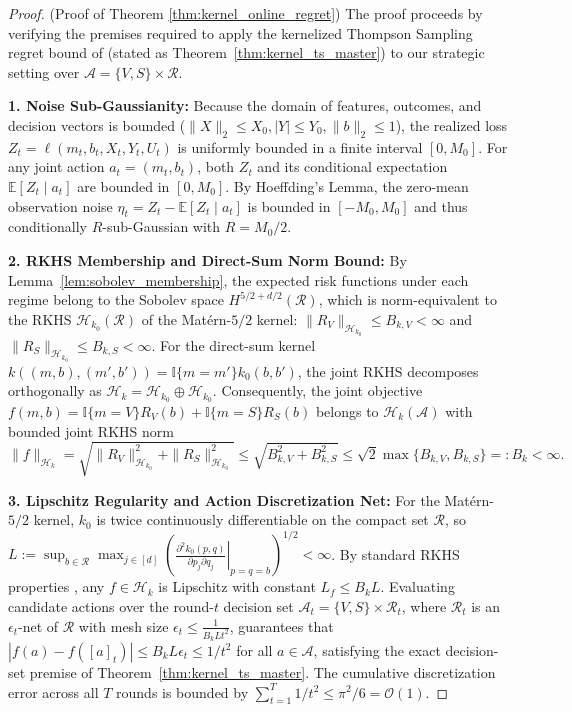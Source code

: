 \begin{proof}(Proof of Theorem \ref{thm:kernel_online_regret})\label{proof:kernel_online_regret}\label{app:proof_kernel_online_regret}
The proof proceeds by verifying the premises required to apply the kernelized Thompson Sampling regret bound of \citet[Theorem 4]{chowdhury2017kernelized} (stated as Theorem~\ref{thm:kernel_ts_master}) to our strategic setting over $\mathcal{A} = \{V, S\} \times \mathcal{R}$.

\noindent\textbf{1. Noise Sub-Gaussianity:} 
Because the domain of features, outcomes, and decision vectors is bounded ($\|X\|_2 \le X_0, |Y| \le Y_0, \|b\|_2 \le 1$), the realized loss $Z_t = \ell(m_t, b_t, X_t, Y_t, U_t)$ is uniformly bounded in a finite interval $[0, M_0]$. For any joint action $a_t = (m_t, b_t)$, both $Z_t$ and its conditional expectation $\mathbb{E}[Z_t \mid a_t]$ are bounded in $[0, M_0]$. By Hoeffding's Lemma, the zero-mean observation noise $\eta_t = Z_t - \mathbb{E}[Z_t \mid a_t]$ is bounded in $[-M_0, M_0]$ and thus conditionally $R$-sub-Gaussian with $R = M_0/2$.

\noindent\textbf{2. RKHS Membership and Direct-Sum Norm Bound:} 
By Lemma~\ref{lem:sobolev_membership}, the expected risk functions under each regime belong to the Sobolev space $H^{5/2+d/2}(\mathcal{R})$, which is norm-equivalent to the RKHS $\mathcal{H}_{k_0}(\mathcal{R})$ of the Matérn-$5/2$ kernel: $\|R_V\|_{\mathcal{H}_{k_0}} \le B_{k,V} < \infty$ and $\|R_S\|_{\mathcal{H}_{k_0}} \le B_{k,S} < \infty$. For the direct-sum kernel $k((m, b), (m', b')) = \mathbb{I}\{m = m'\} k_0(b, b')$, the joint RKHS decomposes orthogonally as $\mathcal{H}_k = \mathcal{H}_{k_0} \oplus \mathcal{H}_{k_0}$. Consequently, the joint objective $f(m, b) = \mathbb{I}\{m=V\} R_V(b) + \mathbb{I}\{m=S\} R_S(b)$ belongs to $\mathcal{H}_k(\mathcal{A})$ with bounded joint RKHS norm
\begin{equation*}
    \|f\|_{\mathcal{H}_k} = \sqrt{\|R_V\|_{\mathcal{H}_{k_0}}^2 + \|R_S\|_{\mathcal{H}_{k_0}}^2} \le \sqrt{B_{k,V}^2 + B_{k,S}^2} \le \sqrt{2}\max\{B_{k,V}, B_{k,S}\} =: B_k < \infty.
\end{equation*}

\noindent\textbf{3. Lipschitz Regularity and Action Discretization Net:} 
For the Matérn-$5/2$ kernel, $k_0$ is twice continuously differentiable on the compact set $\mathcal{R}$, so $L := \sup_{b \in \mathcal{R}} \max_{j \in [d]} \left(\left. \frac{\partial^2 k_0(p,q)}{\partial p_j \partial q_j}\right|_{p=q=b}\right)^{1/2} < \infty$. By standard RKHS properties \citep[Eq.~(7)]{chowdhury2017kernelized}, any $f \in \mathcal{H}_k$ is Lipschitz with constant $L_f \le B_k L$. Evaluating candidate actions over the round-$t$ decision set $\mathcal{A}_t = \{V, S\} \times \mathcal{R}_t$, where $\mathcal{R}_t$ is an $\epsilon_t$-net of $\mathcal{R}$ with mesh size $\epsilon_t \le \frac{1}{B_k L t^2}$, guarantees that $|f(a) - f([a]_t)| \le B_k L \epsilon_t \le 1/t^2$ for all $a \in \mathcal{A}$, satisfying the exact decision-set premise of Theorem~\ref{thm:kernel_ts_master}. The cumulative discretization error across all $T$ rounds is bounded by $\sum_{t=1}^T 1/t^2 \le \pi^2/6 = \mathcal{O}(1)$.


\end{proof}
